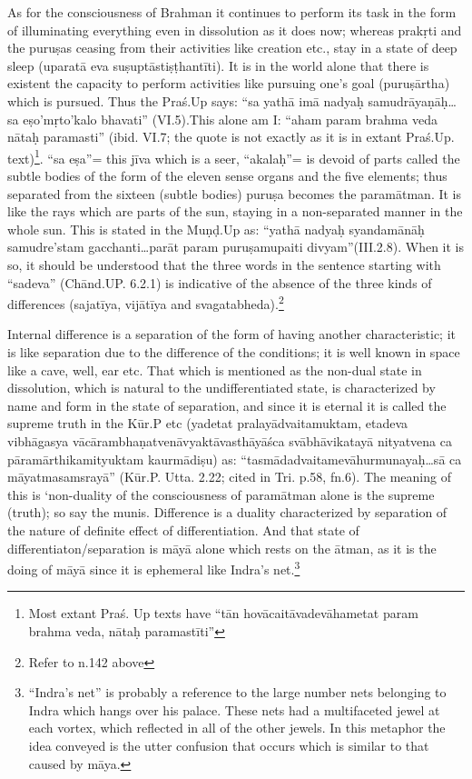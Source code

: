 As for the consciousness of Brahman it continues to perform its task in the form of illuminating everything even in dissolution as it does now; whereas prakṛti and the puruṣas ceasing from their activities like creation etc., stay in a state of deep sleep (uparatā eva suṣuptāstiṣṭhantīti). It is in the world alone that there is existent the capacity to  perform activities like pursuing one’s goal (puruṣārtha)  which is pursued. Thus the Praś.Up says: “sa yathā imā nadyaḥ samudrāyaṇāḥ…sa eṣo’mṛto’kalo bhavati” (VI.5).This alone am I: “aham param brahma veda nātaḥ paramasti” (ibid. VI.7; the quote is not exactly as it is in extant Praś.Up. text)\footnote{Most extant Praś. Up texts have “tān hovācaitāvadevāhametat param brahma veda, nātaḥ paramastīti”}. “sa eṣa”= this jīva which is a  seer, “akalaḥ”= is devoid of parts called the subtle bodies of the form of the eleven sense organs and the five elements; thus separated from the sixteen (subtle bodies) puruṣa becomes the paramātman. It is like the rays which are parts of the sun, staying in a non-separated manner in the whole sun. This is stated in the Muṇḍ.Up as: “yathā nadyaḥ syandamānāḥ samudre’stam gacchanti…parāt param puruṣamupaiti divyam”(III.2.8). When it is so, it should be understood that the three words in the sentence starting with “sadeva” (Chānd.UP. 6.2.1) is indicative of the absence of the three kinds of differences (sajatīya, vijātīya and svagatabheda).\footnote{Refer to n.142 above} 

\vskip -2pt

Internal difference is a separation of the form of having another characteristic; it is like separation due to the difference of the conditions; it is well known in space like a cave, well, ear etc. That which is mentioned as the non-dual state in dissolution, which is natural to the undifferentiated state, is characterized by name and form in the state of separation, and since it is eternal it is called the supreme truth in the Kūr.P etc (yadetat pralayādvaitamuktam, etadeva vibhāgasya vācāram\-bhaṇatvenāvyaktāvasthāyāśca svābhāvikatayā nityatvena ca pāramā\-rthikamityuktam kaurmādiṣu) as: “tasmādadvaitamevāhurmunayaḥ…\-sā ca māyatmasamsrayā” (Kūr.P. Utta. 2.22; cited in Tri. p.58, fn.6).  The meaning of this is ‘non-duality of the consciousness of paramātman alone is the supreme (truth); so say the munis. Difference is a duality characterized by separation of the nature of definite effect of differentiation. And that state of differentiaton/separation is māyā alone which rests on the ātman, as it is the doing of māyā since it is ephemeral like Indra’s net.\footnote{``Indra's net'' is probably a reference to the large number nets belonging to Indra which hangs over his palace. These nets had a multifaceted jewel at each vortex, which reflected in all of the other jewels. In this metaphor the idea conveyed is the utter confusion that occurs which is similar to that caused by māya.} 

